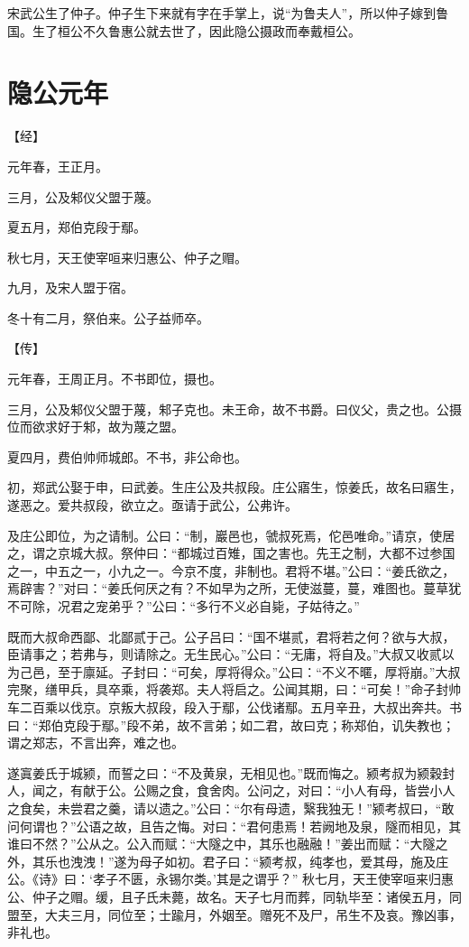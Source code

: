\documentclass[a4paper,12pt,UTF8,twoside]{ctexbook}
\begin{document}
宋武公生了仲子。仲子生下来就有字在手掌上，说“为鲁夫人”，所以仲子嫁到鲁国。生了桓公不久鲁惠公就去世了，因此隐公摄政而奉戴桓公。

\section{隐公元年}

【经】

元年春，王正月。

三月，公及邾仪父盟于蔑。

夏五月，郑伯克段于鄢。

秋七月，天王使宰咺来归惠公、仲子之赗。

九月，及宋人盟于宿。

冬十有二月，祭伯来。公子益师卒。

【传】

元年春，王周正月。不书即位，摄也。

三月，公及邾仪父盟于蔑，邾子克也。未王命，故不书爵。曰仪父，贵之也。公摄位而欲求好于邾，故为蔑之盟。

夏四月，费伯帅师城郎。不书，非公命也。

初，郑武公娶于申，曰武姜。生庄公及共叔段。庄公寤生，惊姜氏，故名曰寤生，遂恶之。爱共叔段，欲立之。亟请于武公，公弗许。

及庄公即位，为之请制。公曰：“制，巖邑也，虢叔死焉，佗邑唯命。”请京，使居之，谓之京城大叔。祭仲曰：“都城过百雉，国之害也。先王之制，大都不过参国之一，中五之一，小九之一。今京不度，非制也。君将不堪。”公曰：“姜氏欲之，焉辟害？”对曰：“姜氏何厌之有？不如早为之所，无使滋蔓，蔓，难图也。蔓草犹不可除，况君之宠弟乎？”公曰：“多行不义必自毙，子姑待之。”

既而大叔命西鄙、北鄙贰于己。公子吕曰：“国不堪贰，君将若之何？欲与大叔，臣请事之；若弗与，则请除之。无生民心。”公曰：“无庸，将自及。”大叔又收贰以为己邑，至于廪延。子封曰：“可矣，厚将得众。”公曰：“不义不暱，厚将崩。”大叔完聚，缮甲兵，具卒乘，将袭郑。夫人将启之。公闻其期，曰：“可矣！”命子封帅车二百乘以伐京。京叛大叔段，段入于鄢，公伐诸鄢。五月辛丑，大叔出奔共。书曰：“郑伯克段于鄢。”段不弟，故不言弟；如二君，故曰克；称郑伯，讥失教也；谓之郑志，不言出奔，难之也。

遂寘姜氏于城颍，而誓之曰：“不及黄泉，无相见也。”既而悔之。颍考叔为颍穀封人，闻之，有献于公。公赐之食，食舍肉。公问之，对曰：“小人有母，皆尝小人之食矣，未尝君之羹，请以遗之。”公曰：“尔有母遗，繄我独无！”颍考叔曰，“敢问何谓也？”公语之故，且告之悔。对曰：“君何患焉！若阙地及泉，隧而相见，其谁曰不然？”公从之。公入而赋：“大隧之中，其乐也融融！”姜出而赋：“大隧之外，其乐也洩洩！”遂为母子如初。君子曰：“颍考叔，纯孝也，爱其母，施及庄公。《诗》曰：‘孝子不匮，永锡尔类。’其是之谓乎？”
秋七月，天王使宰咺来归惠公、仲子之赗。缓，且子氏未薨，故名。天子七月而葬，同轨毕至：诸侯五月，同盟至，大夫三月，同位至；士踰月，外姻至。赠死不及尸，吊生不及哀。豫凶事，非礼也。
\end{document}
